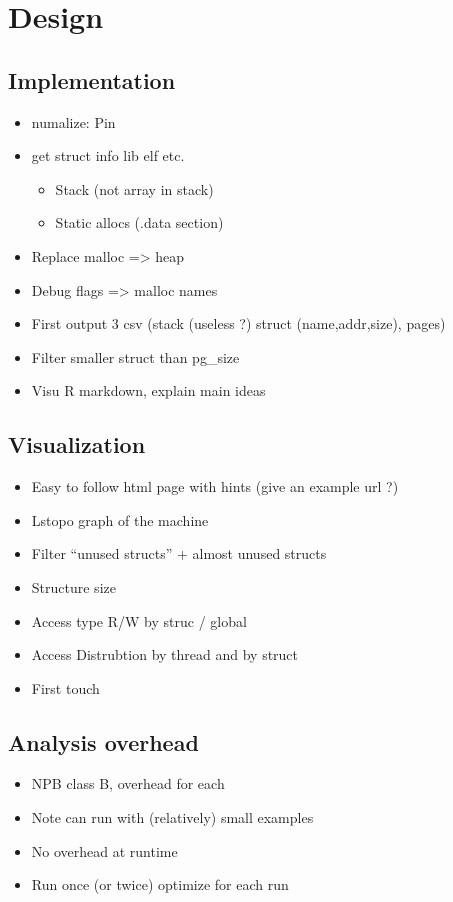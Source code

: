 
\section{Design}
\subsection{Implementation}
\label{sec:design}
\begin{itemize}
    \item numalize: Pin \cite{Luk05Pin}
    \item get struct info lib elf etc.
        \begin{itemize}
            \item Stack (not array in stack)
            \item Static allocs (.data section)
        \end{itemize}
    \item Replace malloc => heap
    \item Debug flags => malloc names
    \item First output 3 csv (stack (useless ?) struct (name,addr,size),
        pages)
    \item Filter smaller struct than pg\_size
    \item Visu R markdown, explain main ideas
\end{itemize}
\subsection{Visualization}

\begin{itemize}
    \item Easy to follow html page with hints (give an example url ?)
    \item Lstopo graph of the machine
    \item Filter ``unused structs'' + almost unused structs
    \item Structure size
    \item Access type R/W by struc / global
    \item Access Distrubtion by thread and by struct
    \item First touch
\end{itemize}

\subsection{Analysis overhead}
\label{sec:expe-overhead}
\begin{itemize}
    \item NPB class B, overhead for each
    \item Note can run with (relatively) small  examples
    \item No overhead at runtime
    \item Run once (or twice) optimize for each run
\end{itemize}
